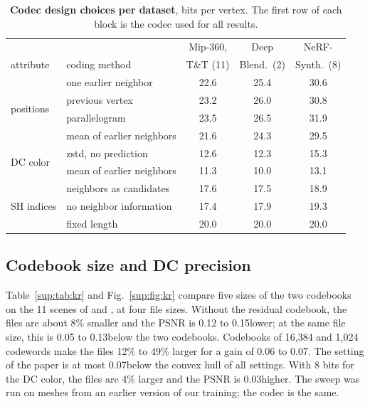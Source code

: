 \begin{table}[h]\centering\footnotesize
\caption{\textbf{Codec design choices per dataset}, bits per vertex. The first row of each block is the codec used for all results.}
\label{sup:tab:choices}
\setlength{\tabcolsep}{3pt}
\begin{tabular}{@{}llccc@{}}
\toprule
 & & Mip-360, & Deep & NeRF- \\
attribute & coding method & T\&T (11) & Blend.\ (2) & Synth.\ (8) \\
\midrule
\multirow{4}{*}{positions} & one earlier neighbor & 22.6 & 25.4 & 30.6 \\
 & previous vertex & 23.2 & 26.0 & 30.8 \\
 & parallelogram & 23.5 & 26.5 & 31.9 \\
 & mean of earlier neighbors & 21.6 & 24.3 & 29.5 \\
\midrule
\multirow{2}{*}{DC color} & zstd, no prediction & 12.6 & 12.3 & 15.3 \\
 & mean of earlier neighbors & 11.3 & 10.0 & 13.1 \\
\midrule
\multirow{3}{*}{SH indices} & neighbors as candidates & 17.6 & 17.5 & 18.9 \\
 & no neighbor information & 17.4 & 17.9 & 19.3 \\
 & fixed length & 20.0 & 20.0 & 20.0 \\
\bottomrule
\end{tabular}
\end{table}

\subsection{Codebook size and DC precision}
Table~\ref{sup:tab:kr} and Fig.~\ref{sup:fig:kr} compare five sizes of the two codebooks on the 11 scenes of \MipNeRF and \TandT, at four file sizes. Without the residual codebook, the files are about 8\% smaller and the PSNR is 0.12 to 0.15\dB lower; at the same file size, this is 0.05 to 0.13\dB below the two codebooks. Codebooks of 16{,}384 and 1{,}024 codewords make the files 12\% to 49\% larger for a gain of 0.06 to 0.07\dB. The setting of the paper is at most 0.07\dB below the convex hull of all settings. With 8 bits for the DC color, the files are 4\% larger and the PSNR is 0.03\dB higher. The sweep was run on meshes from an earlier version of our training; the codec is the same.

